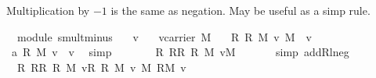 \begin{isabellebody}
\begin{isamarkuptext}
Multiplication by $-1$ is the same as negation. May be useful as a simp rule.%
\end{isamarkuptext}%
\isamarkuptrue%
\isamarkupfalse%
\ {\isacharparenleft}\ module{\isacharparenright}\ smult{\isacharunderscore}minus{\isacharunderscore}{}{\isacharcolon}\isanewline
\ \ \ v\isanewline
\ \ \ {}{\isacharcolon}{\isachardoublequoteopen}v{\isasymin}carrier\ M{\isachardoublequoteclose}\isanewline
\ \ \ {\isachardoublequoteopen}{\isacharparenleft}{\isasymominus}\isactrlbsub R\isactrlesub \ {\isasymone}\isactrlbsub R\isactrlesub {\isacharparenright}\ {\isasymodot}\isactrlbsub M\isactrlesub \ v{\isacharequal}\ {\isacharparenleft}{\isasymominus}\isactrlbsub M\isactrlesub \ \ v{\isacharparenright}{\isachardoublequoteclose}\isanewline
%
\isadelimproof
\isanewline
%
\endisadelimproof
%
\isatagproof
{}\isamarkupfalse%
\ {\isacharminus}\isanewline
\ \ \isamarkupfalse%
\ {}\ \isamarkupfalse%
\ a{}{\isacharcolon}\ {\isachardoublequoteopen}{\isasymone}\isactrlbsub R\isactrlesub \ {\isasymodot}\isactrlbsub M\isactrlesub \ v\ {\isacharequal}\ v{\isachardoublequoteclose}\ \isamarkupfalse%
\ simp\isanewline
\ \ \isamarkupfalse%
\ {}\ \isamarkupfalse%
\ {}{\isacharcolon}\ {\isachardoublequoteopen}{\isacharparenleft}{\isacharparenleft}{\isasymominus}\isactrlbsub R\isactrlesub \ {\isasymone}\isactrlbsub R\isactrlesub {\isacharparenright}{\isasymoplus}\isactrlbsub R\isactrlesub \ {\isasymone}\isactrlbsub R\isactrlesub {\isacharparenright}\ {\isasymodot}\isactrlbsub M\isactrlesub \ v{\isacharequal}{\isasymzero}\isactrlbsub M\isactrlesub {\isachardoublequoteclose}\ \isanewline
\ \ \ \ \isamarkupfalse%
\ {\isacharparenleft}simp\ add{\isacharcolon}R{\isachardot}l{\isacharunderscore}neg{\isacharparenright}\isanewline
\ \ \isamarkupfalse%
\ {}\ \isamarkupfalse%
\ {}{\isacharcolon}\ {\isachardoublequoteopen}{\isacharparenleft}{\isacharparenleft}{\isasymominus}\isactrlbsub R\isactrlesub \ {\isasymone}\isactrlbsub R\isactrlesub {\isacharparenright}{\isasymoplus}\isactrlbsub R\isactrlesub \ {\isasymone}\isactrlbsub R\isactrlesub {\isacharparenright}\ {\isasymodot}\isactrlbsub M\isactrlesub \ v{\isacharequal}{\isacharparenleft}{\isasymominus}\isactrlbsub R\isactrlesub \ {\isasymone}\isactrlbsub R\isactrlesub {\isacharparenright}\ {\isasymodot}\isactrlbsub M\isactrlesub \ v\ {\isasymoplus}\isactrlbsub M\isactrlesub \ {\isasymone}\isactrlbsub R\isactrlesub {\isasymodot}\isactrlbsub M\isactrlesub \ v{\isachardoublequoteclose}\isanewline

\end{isabellebody}
